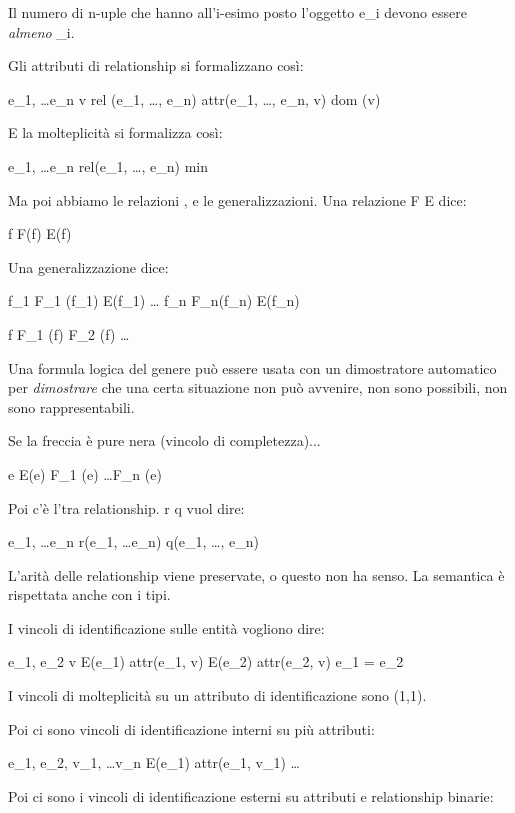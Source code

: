 Il numero di n-uple che hanno all'i-esimo posto l'oggetto e_i devono essere \emph{almeno} \min_i.

Gli attributi di relationship si formalizzano cos\`i:

\forall e_1, \ldots e_n \forall v rel (e_1, \ldots, e_n) \land attr(e_1, \ldots, e_n, v) \to dom (v)

E la molteplicit\`a si formalizza cos\`i:

\forall e_1, \ldots e_n rel(e_1, \ldots, e_n) \implies {} \ge min

Ma poi abbiamo le relazioni \isa, e le generalizzazioni. Una relazione F \isa E dice:

\forall f F(f) \implies E(f)

Una generalizzazione dice:

\forall f_1 F_1 (f_1) \implies E(f_1) \land \ldots \land
\forall f_n F_n(f_n) \implies E(f_n) \land

\forall f F_1 (f) \implies \not F_2 (f) \land \ldots

Una formula logica del genere pu\`o essere usata con un dimostratore automatico per \emph{dimostrare} che una certa situazione non pu\`o avvenire, non sono possibili, non sono rappresentabili.

Se la freccia \`e pure nera (vincolo di completezza)...

\forall e E(e) \implies F_1 (e) \lor \ldots \lor F_n (e)

Poi c'\`e l'\isa tra relationship. r \isa q vuol dire:

\forall e_1, \ldots e_n r(e_1, \ldots e_n) \implies q(e_1, \ldots, e_n)

L'arit\`a delle relationship viene preservate, o questo non ha senso. La semantica \`e rispettata anche con i tipi.

I vincoli di identificazione sulle entit\`a vogliono dire:

\forall e_1, e_2 \forall v E(e_1) \land attr(e_1, v) \land E(e_2) \land attr(e_2, v) \implies e_1 = e_2

I vincoli di molteplicit\`a su un attributo di identificazione sono (1,1).

Poi ci sono vincoli di identificazione interni su pi\`u attributi:

\forall e_1, e_2, \forall v_1, \ldots v_n E(e_1) \land attr(e_1, v_1) \land \ldots 

Poi ci sono i vincoli di identificazione esterni su attributi e relationship binarie:

